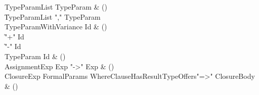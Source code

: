 \begin{bbgrammar}
 TypeParamList  \label{prod:TypeParamList}  \: TypeParam & ()\\
    \| TypeParamList \xcd"," TypeParam\\
 TypeParamWithVariance  \label{prod:TypeParamWithVariance}  \: Id & ()\\
    \| \xcd"+" Id\\
    \| \xcd"-" Id\\
 TypeParam  \label{prod:TypeParam}  \: Id & ()\\
 AssignmentExp  \label{prod:AssignmentExp}  \: Exp  \xcd"->" Exp  & ()\\
 ClosureExp  \label{prod:ClosureExp}  \: FormalParams WhereClause\opt HasResultType\opt Offers\opt \xcd"=>" ClosureBody & ()\\
\end{bbgrammar}

